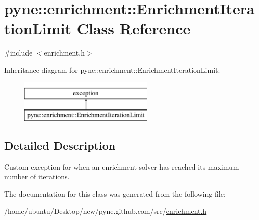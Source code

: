 \hypertarget{classpyne_1_1enrichment_1_1_enrichment_iteration_limit}{}\section{pyne\+:\+:enrichment\+:\+:Enrichment\+Iteration\+Limit Class Reference}
\label{classpyne_1_1enrichment_1_1_enrichment_iteration_limit}


{\ttfamily \#include $<$enrichment.\+h$>$}

Inheritance diagram for pyne\+:\+:enrichment\+:\+:Enrichment\+Iteration\+Limit\+:\begin{figure}[H]
\begin{center}
\leavevmode
\includegraphics[height=2.000000cm]{classpyne_1_1enrichment_1_1_enrichment_iteration_limit}
\end{center}
\end{figure}


\subsection{Detailed Description}
Custom exception for when an enrichment solver has reached its maximum number of iterations. 

The documentation for this class was generated from the following file\+:\begin{DoxyCompactItemize}
\item 
/home/ubuntu/\+Desktop/new/pyne.\+github.\+com/src/\hyperlink{enrichment_8h}{enrichment.\+h}\end{DoxyCompactItemize}
